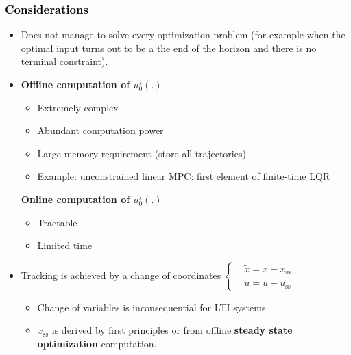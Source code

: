 \subsubsection*{\textcolor{black}{Considerations}}
\begin{itemize}
    \item Does not manage to solve every optimization problem (for example when the optimal input turns out to be a the end of the horizon and there is no terminal constraint).
    \item \begin{minipage}[t]{0.45\textwidth}
            \textbf{Offline computation of $u^\star_0(.)$}
            \begin{itemize}
                \item Extremely complex
                \item Abundant computation power
                \item Large memory requirement (store all trajectories)
                \item Example: unconstrained linear MPC: first element of finite-time LQR
            \end{itemize}
         \end{minipage}\hfill
         \begin{minipage}[t]{0.45\textwidth}
            \textbf{Online computation of $u^\star_0(.)$}
            \begin{itemize}
                \item Tractable
                \item Limited time 
            \end{itemize}
        \end{minipage}
    \item Tracking is achieved by a change of coordinates $\left\{
        \begin{aligned}
            &\tilde{x} = x - x_\mathrm{ss} \\
            &\tilde{u} = u - u_\mathrm{ss}
        \end{aligned}
        \right.$
        \begin{itemize}
            \item Change of variables is inconsequential for LTI systems.
            \item $x_\mathrm{ss}$ is derived by first principles or from offline \textbf{steady state optimization} computation.
        \end{itemize}
\end{itemize}

